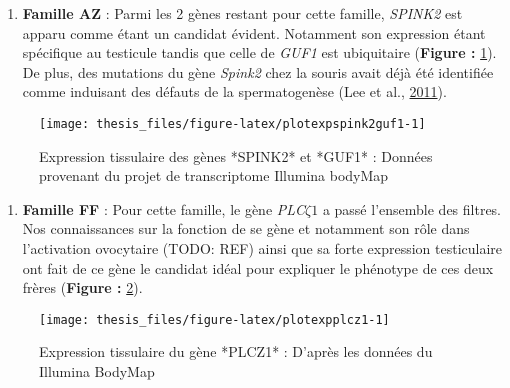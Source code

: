 \documentclass[12pt,twoside]{reedthesis}
\providecommand{\tightlist}{%
  \setlength{\itemsep}{0pt}\setlength{\parskip}{0pt}}
\theoremstyle{definition}
\theoremstyle{definition}
\theoremstyle{remark}
\begin{document}
  \begin{enumerate}
  \def\labelenumi{\arabic{enumi}.}
  \tightlist
  \item
    \textbf{Famille AZ} : Parmi les 2 gènes restant pour cette famille,
    \emph{SPINK2} est apparu comme étant un candidat évident. Notamment
    son expression étant spécifique au testicule tandis que celle de
    \emph{GUF1} est ubiquitaire (\textbf{Figure :
    }\ref{fig:plotexpspink2guf1}). De plus, des mutations du gène
    \emph{Spink2} chez la souris avait déjà été identifiée comme induisant
    des défauts de la spermatogenèse (Lee et al.,
    \protect\hyperlink{ref-Lee2011}{2011}).
  \end{enumerate}
  
  \begin{figure}
  
  {\centering \texttt{[image: thesis\_files/figure-latex/plotexpspink2guf1-1]} 
  
  }
  
  \caption[Expression tissulaire des gènes *SPINK2* et *GUF1*]{Expression tissulaire des gènes *SPINK2* et *GUF1* : Données provenant du projet de transcriptome Illumina bodyMap}\label{fig:plotexpspink2guf1}
  \end{figure}
  
  \begin{enumerate}
  \def\labelenumi{\arabic{enumi}.}
  \setcounter{enumi}{1}
  \tightlist
  \item
    \textbf{Famille FF} : Pour cette famille, le gène
    \emph{PLC}\(\zeta 1\) a passé l'ensemble des filtres. Nos
    connaissances sur la fonction de se gène et notamment son rôle dans
    l'activation ovocytaire (TODO: REF) ainsi que sa forte expression
    testiculaire ont fait de ce gène le candidat idéal pour expliquer le
    phénotype de ces deux frères (\textbf{Figure :
    }\ref{fig:plotexpplcz1}).
  \end{enumerate}
  
  \begin{figure}
  
  {\centering \texttt{[image: thesis\_files/figure-latex/plotexpplcz1-1]} 
  
  }
  
  \caption[Expression tissulaire du gène *PLCZ1*]{Expression tissulaire du gène *PLCZ1* : D'après les données du Illumina BodyMap}\label{fig:plotexpplcz1}
  \end{figure}
  
\end{document}
